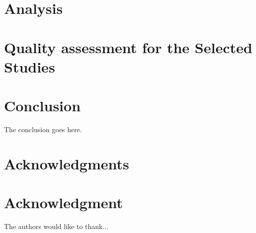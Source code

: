 \documentclass[conference,compsoc]{IEEEtran}
\begin{document}
\section{Analysis}

\section{Quality assessment for the Selected Studies}





\section{Conclusion}
The conclusion goes here.







\ifCLASSOPTIONcompsoc
  \section*{Acknowledgments}
\else
  \section*{Acknowledgment}
\fi

The authors would like to thank...


\printbibliography


%
%
%
\end{document}
